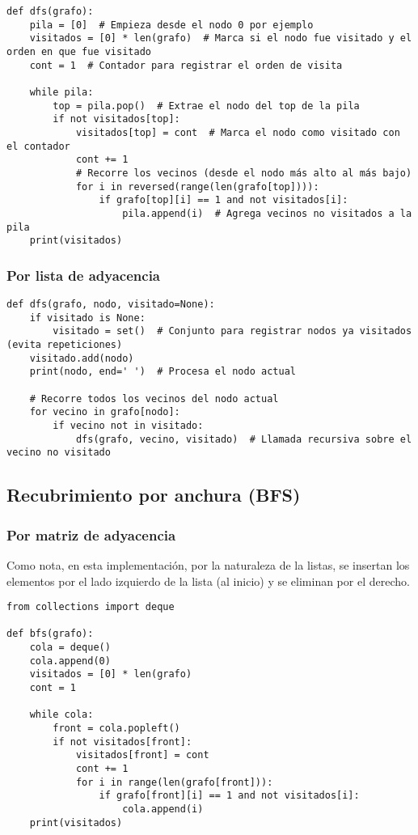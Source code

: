 \documentclass[12pt,letterpaper]{article}
\begin{document}
\begin{verbatim}
def dfs(grafo):
    pila = [0]  # Empieza desde el nodo 0 por ejemplo
    visitados = [0] * len(grafo)  # Marca si el nodo fue visitado y el orden en que fue visitado
    cont = 1  # Contador para registrar el orden de visita

    while pila:
        top = pila.pop()  # Extrae el nodo del top de la pila
        if not visitados[top]:
            visitados[top] = cont  # Marca el nodo como visitado con el contador
            cont += 1
            # Recorre los vecinos (desde el nodo más alto al más bajo)
            for i in reversed(range(len(grafo[top]))):
                if grafo[top][i] == 1 and not visitados[i]:
                    pila.append(i)  # Agrega vecinos no visitados a la pila
    print(visitados)
\end{verbatim}

\subsubsection{Por lista de adyacencia}

\begin{verbatim}
def dfs(grafo, nodo, visitado=None):
    if visitado is None:
        visitado = set()  # Conjunto para registrar nodos ya visitados (evita repeticiones)
    visitado.add(nodo)
    print(nodo, end=' ')  # Procesa el nodo actual

    # Recorre todos los vecinos del nodo actual
    for vecino in grafo[nodo]:
        if vecino not in visitado:
            dfs(grafo, vecino, visitado)  # Llamada recursiva sobre el vecino no visitado
\end{verbatim}

\subsection{Recubrimiento por anchura (BFS)}

\subsubsection{Por matriz de adyacencia}

Como nota, en esta implementación, por la naturaleza de la listas, se insertan los elementos por el lado izquierdo de la lista (al inicio) y se eliminan por el derecho.

\begin{verbatim}
from collections import deque

def bfs(grafo):
    cola = deque()
    cola.append(0)
    visitados = [0] * len(grafo)
    cont = 1

    while cola:
        front = cola.popleft()
        if not visitados[front]:
            visitados[front] = cont
            cont += 1
            for i in range(len(grafo[front])):
                if grafo[front][i] == 1 and not visitados[i]:
                    cola.append(i)
    print(visitados)
\end{verbatim}
\end{document}
